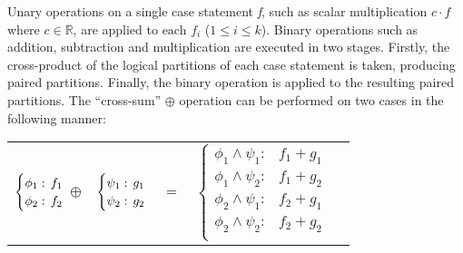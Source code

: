 Unary operations on a single case statement \emph{f}, such as scalar multiplication $c \cdot f$ where $ c \in \mathbb{R} $, are applied to  each $f_i$ ($1 \leq i \leq k$). Binary operations such as addition, subtraction and multiplication are executed in two stages. Firstly, the cross-product of the logical partitions of each case statement is taken, producing paired partitions. Finally, the binary operation is applied to the resulting paired partitions. The ``cross-sum'' $\oplus$ operation can be performed on two cases in the following manner:
{\footnotesize 
    \begin{center}
        \begin{tabular}{r c c c l}
            $\begin{cases}
            \phi_1: \hspace{-1mm} & \hspace{-1mm} f_1  \\ 
            \phi_2: \hspace{-1mm} & \hspace{-1mm} f_2  \\ 
            \end{cases}$
            $\oplus$
            &
            \hspace{-4mm}
            $\begin{cases}
            \psi_1: \hspace{-1mm} & \hspace{-1mm} g_1  \\ 
            \psi_2: \hspace{-1mm} & \hspace{-1mm} g_2  \\ 
            \end{cases}$
            &
            \hspace{-4mm} 
            $ = $
            &
            \hspace{-4mm}
            $\begin{cases}
            \phi_1 \wedge \psi_1: & f_1 + g_1 \\
            \phi_1 \wedge \psi_2: & f_1 + g_2 \\
            \phi_2 \wedge \psi_1: & f_2 + g_1 \\
            \phi_2 \wedge \psi_2: & f_2 + g_2  \\
            \end{cases}$
        \end{tabular}
    \end{center}
}%

